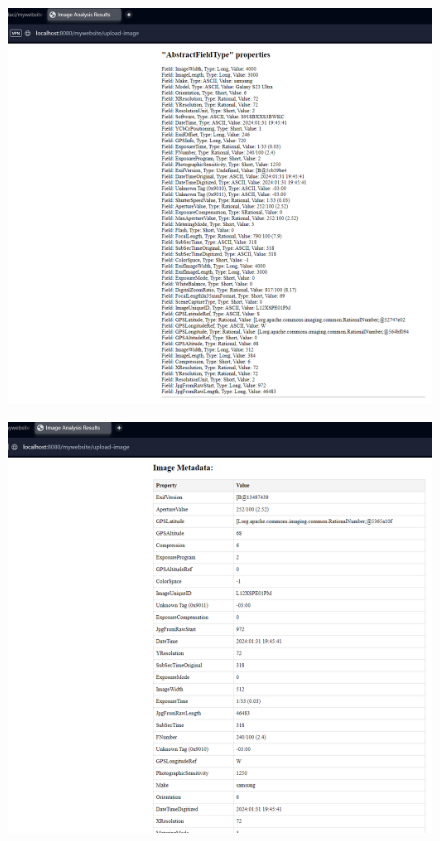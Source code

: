 \documentclass[sigconf]{acmart}
\begin{document}
\begin{figure}[H]
    \centering
    \includegraphics[width=1\linewidth]{web3.png}
    \caption{}
    \label{fig:enter-label}
\end{figure}
\begin{figure}[H]
    \centering
    \includegraphics[width=1\linewidth]{web4.png}
    \caption{}
    \label{fig:enter-label}
\end{figure}
\end{document}
